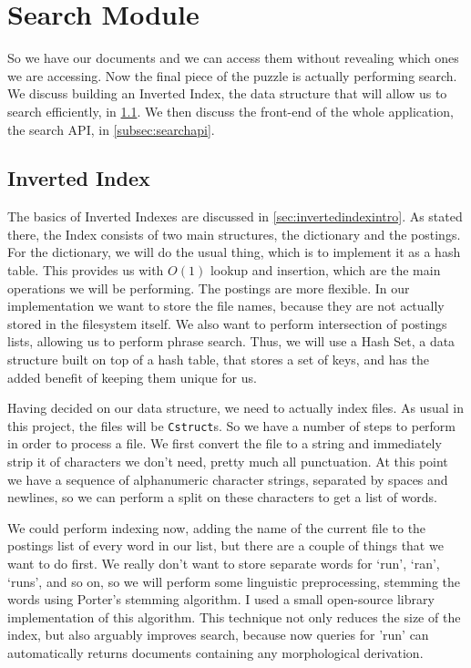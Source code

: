 \documentclass[12pt,a4paper,twoside,openright]{report}
\begin{document}
\section{Search Module}
\label{sec:searchmodule}

So we have our documents and we can access them without revealing which ones we are accessing. Now the final piece of the puzzle is actually performing search. We discuss building an Inverted Index, the data structure that will allow us to search efficiently, in \cref{subsec:invertedindex}. We then discuss the front-end of the whole application, the search API, in \cref{subsec:searchapi}.

\subsection{Inverted Index}
\label{subsec:invertedindex}

The basics of Inverted Indexes are discussed in \cref{sec:invertedindexintro}. As stated there, the Index consists of two main structures, the dictionary and the postings. For the dictionary, we will do the usual thing, which is to implement it as a hash table. This provides us with $O(1)$ lookup and insertion, which are the main operations we will be performing. The postings are more flexible. In our implementation we want to store the file names, because they are not actually stored in the filesystem itself. We also want to perform intersection of postings lists, allowing us to perform phrase search. Thus, we will use a Hash Set, a data structure built on top of a hash table, that stores a set of keys, and has the added benefit of keeping them unique for us.

Having decided on our data structure, we need to actually index files. As usual in this project, the files will be \texttt{Cstruct}s. So we have a number of steps to perform in order to process a file. We first convert the file to a string and immediately strip it of characters we don't need, pretty much all punctuation. At this point we have a sequence of alphanumeric character strings, separated by spaces and newlines, so we can perform a split on these characters to get a list of words.

We could perform indexing now, adding the name of the current file to the postings list of every word in our list, but there are a couple of things that we want to do first. We really don't want to store separate words for `run', `ran', `runs', and so on, so we will perform some linguistic preprocessing, stemming the words using Porter's stemming algorithm. I used a small open-source library implementation of this algorithm. This technique not only reduces the size of the index, but also arguably improves search, because now queries for 'run' can automatically returns documents containing any morphological derivation.
\end{document}
